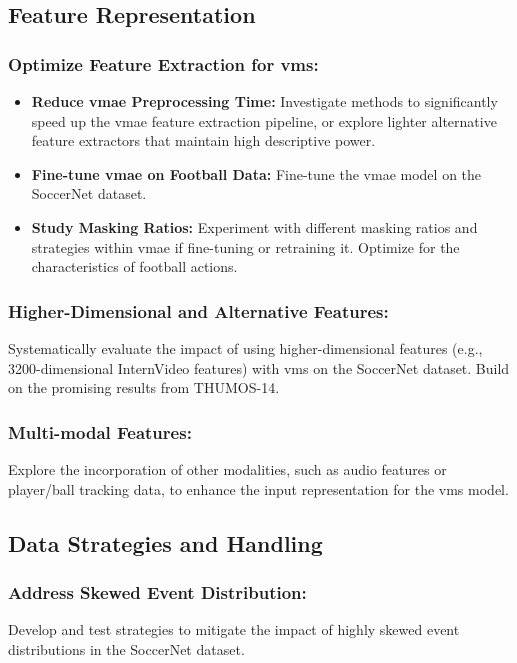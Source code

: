 \subsection{Feature Representation}

\subsubsection{Optimize Feature Extraction for \acrshort{vms}:}
    \begin{itemize}
        \item \textbf{Reduce \acrshort{vmae} Preprocessing Time:} Investigate methods to significantly speed up the \acrshort{vmae} feature extraction pipeline, or explore lighter alternative feature extractors that maintain high descriptive power.
        \item \textbf{Fine-tune \acrshort{vmae} on Football Data:} Fine-tune the \acrshort{vmae} model on the SoccerNet dataset.
        \item \textbf{Study Masking Ratios:} Experiment with different masking ratios and strategies within \acrshort{vmae} if fine-tuning or retraining it. Optimize for the characteristics of football actions.
    \end{itemize}
    
\subsubsection{Higher-Dimensional and Alternative Features:} 
Systematically evaluate the impact of using higher-dimensional features (e.g., 3200-dimensional InternVideo features) with \acrshort{vms} on the SoccerNet dataset. Build on the promising results from THUMOS-14.

\subsubsection{Multi-modal Features:} 
Explore the incorporation of other modalities, such as audio features or player/ball tracking data, to enhance the input representation for the \acrshort{vms} model.

\subsection{Data Strategies and Handling}

\subsubsection{Address Skewed Event Distribution:} Develop and test strategies to mitigate the impact of highly skewed event distributions in the SoccerNet dataset.

